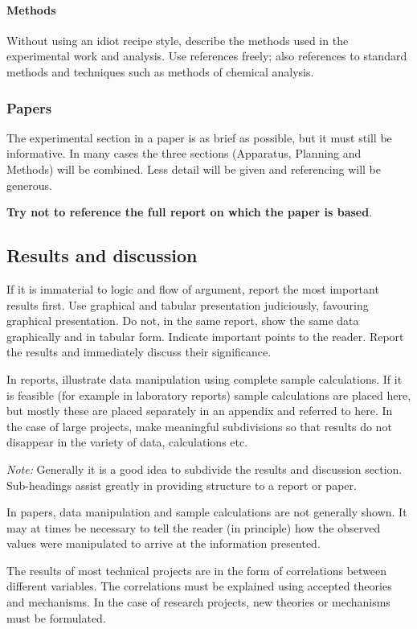 \documentclass[a5paper, 10pt]{article}
\begin{document}
\paragraph{Methods}
Without using an idiot recipe style, describe the methods used in the
experimental work and analysis.  Use references freely; also
references to standard methods and techniques such as methods of
chemical analysis.

\subsubsection{Papers}
The experimental section in a paper is as brief as possible, but it
must still be informative.  In many cases the three sections
(Apparatus, Planning and Methods) will be combined.  
Less detail will be given and referencing will be generous.

\textbf{Try not to reference the full report on which the paper is based}.

\subsection{Results and discussion}
\label{sec:results-and-discussion}
If it is immaterial to logic and flow of argument, report the most
important results first.  Use graphical and tabular presentation
judiciously, favouring graphical presentation.  Do not, in the same
report, show the same data graphically and in tabular form.  Indicate
important points to the reader.  
Report the results and immediately discuss their significance.

In reports, illustrate data manipulation using complete sample
calculations.  If it is feasible (for example in laboratory reports)
sample calculations are placed here, but mostly these are placed
separately in an appendix and referred to here.  In the case of large
projects, make meaningful subdivisions so that results do not
disappear in the variety of data, calculations etc.

\emph{Note:} Generally it is a good idea to subdivide the results and discussion section.
Sub-headings assist greatly in providing structure to a report or paper.

In papers, data manipulation and sample calculations are not generally
shown.  It may at times be necessary to tell the reader (in principle)
how the observed values were manipulated to arrive at the information
presented.

The results of most technical projects are in the form of correlations
between different variables.  The correlations must be explained using
accepted theories and mechanisms.  In the case of research projects,
new theories or mechanisms must be formulated.
\end{document}
